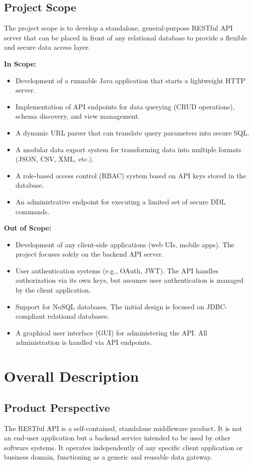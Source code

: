 \documentclass[12pt, a4paper]{report}
\begin{document}
\subsection{Project Scope}
The project scope is to develop a standalone, general-purpose RESTful API server that can be placed in front of any relational database to provide a flexible and secure data access layer.

\textbf{In Scope:}
\begin{itemize}
    \item Development of a runnable Java application that starts a lightweight HTTP server.
    \item Implementation of API endpoints for data querying (CRUD operations), schema discovery, and view management.
    \item A dynamic URL parser that can translate query parameters into secure SQL.
    \item A modular data export system for transforming data into multiple formats (JSON, CSV, XML, etc.).
    \item A role-based access control (RBAC) system based on API keys stored in the database.
    \item An administrative endpoint for executing a limited set of secure DDL commands.
\end{itemize}

\textbf{Out of Scope:}
\begin{itemize}
    \item Development of any client-side applications (web UIs, mobile apps). The project focuses solely on the backend API server.
    \item User authentication systems (e.g., OAuth, JWT). The API handles authorization via its own keys, but assumes user authentication is managed by the client application.
    \item Support for NoSQL databases. The initial design is focused on JDBC-compliant relational databases.
    \item A graphical user interface (GUI) for administering the API. All administration is handled via API endpoints.
\end{itemize}

\section{Overall Description}
\subsection{Product Perspective}
The RESTful API is a self-contained, standalone middleware product. It is not an end-user application but a backend service intended to be used by other software systems. It operates independently of any specific client application or business domain, functioning as a generic and reusable data gateway.
\end{document}
